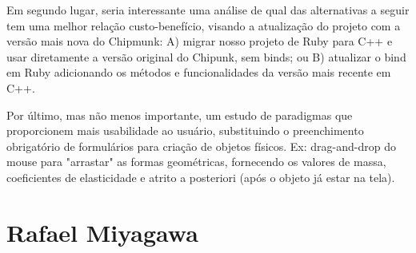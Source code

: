 Em segundo lugar, seria interessante uma análise de qual das alternativas a seguir tem uma melhor relação custo-benefício, visando a atualização do projeto com a versão mais nova do Chipmunk: A) migrar nosso projeto de Ruby para C++ e usar diretamente a versão original do Chipunk, sem binds; ou B) atualizar o bind em Ruby adicionando os métodos e funcionalidades da versão mais recente em C++.

Por último, mas não menos importante, um estudo de paradigmas que proporcionem mais usabilidade ao usuário, substituindo o preenchimento obrigatório de formulários para criação de objetos físicos. Ex: drag-and-drop do mouse para "arrastar" as formas geométricas, fornecendo os valores de massa, coeficientes de elasticidade e atrito a posteriori (após o objeto já estar na tela).


\section{Rafael Miyagawa}
